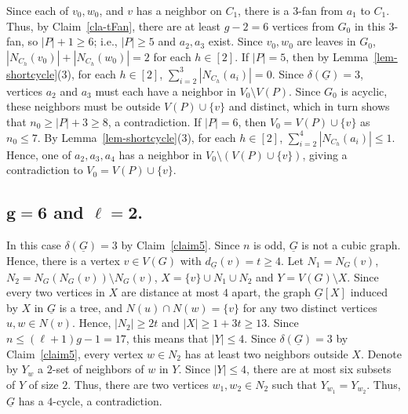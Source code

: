 \documentclass[12pt,oneside]{amsart}
\begin{document}
Since each of $v_0, w_0$, and $v$ has a neighbor on $C_1$, there is a 3-fan from $a_1$ to $C_1$. Thus, by Claim~\ref{cla-tFan}, there are at least $g-2=6$ vertices from $G_0$ in this 3-fan, so $|P|+1 \geq 6$; i.e., $|P|\geq 5$ and $a_2, a_3$ exist. Since $v_0, w_0$ are leaves in $G_0$, $|N_{C_h}(v_0)| + |N_{C_h}(w_0)| =2$ for each $h\in [2]$. If $|P|=5$, then by Lemma~\ref{lem-shortcycle}(3), for each $h\in [2]$, $\sum_{i=2}^3|N_{C_h}(a_i)| =0$.  Since $\delta(\underline{G})=3$, vertices  $a_2$ and $a_3$ must each have a neighbor in $V_0\setminus V(P)$. Since $G_0$ is acyclic, these neighbors must be outside $V(P)\cup\{v\}$ and distinct, which in turn shows that  $n_0\geq |P|+3\geq 8$, a contradiction. If $|P| =6$, then $V_0 = V(P)\cup \{v\}$ as $n_0\le 7$. By Lemma~\ref{lem-shortcycle}(3), for each $h\in [2]$, $\sum_{i=2}^4|N_{C_h}(a_i)| \le 1$. Hence, one of $a_2, a_3, a_4$ has a neighbor in $V_0\setminus (V(P)\cup \{v\})$, giving a contradiction to $V_0 = V(P)\cup \{v\}$.



\subsection{\texorpdfstring{${\mathbf{g= 6}}$}{g=6} and \texorpdfstring{$\mathbf{\ell=2}$}{l=2}.} In this case $\delta(\underline{G}) =3$ by Claim~\ref{claim5}.
Since $n$ is odd, $\underline{G}$ is not a cubic graph. Hence, there is a vertex $v\in V(G)$ with  $d_{\underline{G}}(v) = t\geq 4$.
Let $N_1=N_{G}(v)$, $N_2= N_G(N_G(v)) \setminus N_G(v)$, $X=\{v\}\cup N_1\cup N_2$ and $Y= V(G) \setminus X $. Since every two vertices in $X$ are distance at most $4$ apart, the graph $\underline{G}[X]$ induced by $X$ in $\underline{G}$ is a tree, and $N(u)\cap N(w) = \{v\} $ for any two distinct vertices $u, w\in N(v)$. Hence, $|N_2| \ge 2t$ and $|X| \ge 1+3t \ge 13$.
Since $n\leq (\ell+1)g-1=17$, this means that $|Y| \le 4$. Since $\delta(\underline{G}) =3$ by Claim~\ref{claim5}, every vertex $w\in N_2$ has at least two neighbors outside $X$. Denote by $Y_w$ a $2$-set of neighbors of $w$ in $Y$. Since $|Y| \le 4$, there are at most six subsets of $Y$ of size $2$. Thus, there are two vertices $w_1, w_2\in N_2$ such that $Y_{w_1} = Y_{w_2}$. Thus, $\underline{G}$ has a $4$-cycle, a contradiction.
\end{document}

